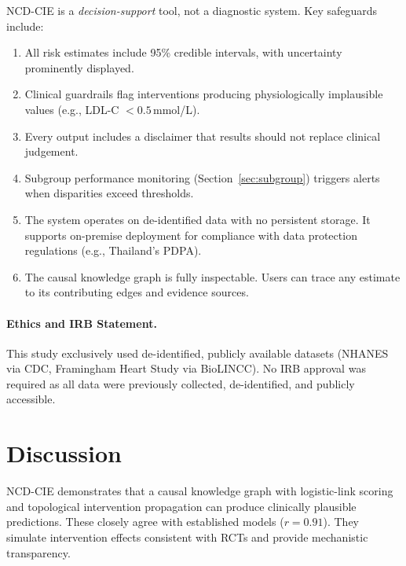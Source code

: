 \documentclass[runningheads]{llncs}
\begin{document}
NCD-CIE is a \emph{decision-support} tool, not a diagnostic system.
Key safeguards include:
\begin{enumerate}
\item All risk estimates include 95\% credible intervals, with
  uncertainty prominently displayed.
\item Clinical guardrails flag interventions producing physiologically
  implausible values (e.g., LDL-C $< 0.5$\,mmol/L).
\item Every output includes a disclaimer that results should not
  replace clinical judgement.
\item Subgroup performance monitoring (Section~\ref{sec:subgroup})
  triggers alerts when disparities exceed thresholds.
\item The system operates on de-identified data with no persistent
  storage.
  It supports on-premise deployment for compliance with data
  protection regulations (e.g., Thailand's PDPA).
\item The causal knowledge graph is fully inspectable.
  Users can trace any estimate to its contributing edges and evidence
  sources.
\end{enumerate}

\paragraph{Ethics and IRB Statement.}
This study exclusively used de-identified, publicly available
datasets (NHANES via CDC, Framingham Heart Study via BioLINCC).
No IRB approval was required as all data were previously collected,
de-identified, and publicly accessible.

\section{Discussion}\label{sec:discussion}

NCD-CIE demonstrates that a causal knowledge graph with logistic-link
scoring and topological intervention propagation can produce
clinically plausible predictions.
These closely agree with established models ($r = 0.91$).
They simulate intervention effects consistent with RCTs and provide
mechanistic transparency.
\end{document}
